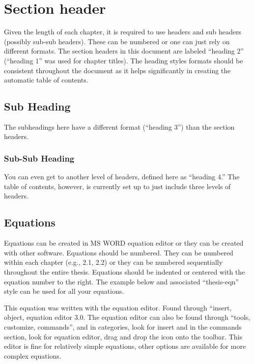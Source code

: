 \section{Section header}

Given the length of each chapter, it is required to use headers and sub headers (possibly sub-sub headers).  These can be numbered or one can just rely on different formats.  The section headers in this document are labeled “heading 2” (“heading 1” was used for chapter titles).  The heading styles formats should be consistent throughout the document as it helps significantly in creating the automatic table of contents.

\subsection{Sub Heading}

The subheadings here have a different format (“heading 3”) than the section headers.

\subsubsection{Sub-Sub Heading}

You can even get to another level of headers, defined here as “heading 4.”  The table of contents, however, is currently set up to just include three levels of headers.

\subsection{Equations}

Equations can be created in MS WORD equation editor or they can be created with other software.  Equations should be numbered.  They can be numbered within each chapter (e.g., 2.1, 2.2) or they can be numbered sequentially throughout the entire thesis.  Equations should be indented or centered with the equation number to the right.  The example below and associated “thesis-eqn” style can be used for all your equations.


This equation was written with the equation editor. Found through “insert, object, equation editor 3.0. The equation editor can also be found through “tools, customize, commands”, and in categories, look for insert and in the commands section, look for equation editor, drag and drop the icon onto the toolbar. This editor is fine for relatively simple equations, other options are available for more complex equations.

